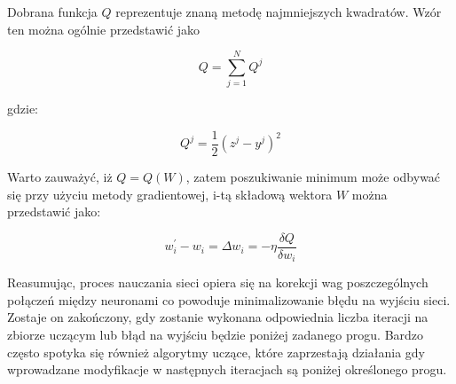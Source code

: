 Dobrana funkcja $Q$ reprezentuje znaną metodę najmniejszych kwadratów.
Wzór ten można ogólnie przedstawić jako

\begin{equation}
Q = \sum_{j = 1}^{N} Q^{j}
\label{eq:common_crit}
\end{equation}

gdzie:

\begin{equation}
Q^{j} = \frac{1}{2}(z^{j} - y^{j})^{2}
\label{eq:condition_crit}
\end{equation}

Warto zauważyć, iż $Q = Q(W)$, zatem poszukiwanie minimum może odbywać się przy użyciu metody gradientowej, i-tą składową wektora $W$ można przedstawić jako:

\begin{equation}
w^{'}_i - w_{i} = \Delta w_{i} = - \eta \frac{\delta Q}{\delta w_{i}}
\label{eq:delta_member}
\end{equation}


Reasumując, proces nauczania sieci opiera się na korekcji wag poszczególnych połączeń między neuronami co powoduje minimalizowanie błędu na wyjściu sieci. Zostaje on zakończony, gdy zostanie wykonana odpowiednia liczba iteracji na zbiorze uczącym lub błąd na wyjściu będzie poniżej zadanego progu. Bardzo często spotyka się również algorytmy uczące, które zaprzestają działania gdy wprowadzane modyfikacje w następnych iteracjach są poniżej określonego progu.



